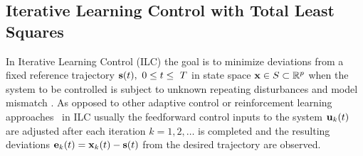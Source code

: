 \subsection{Iterative Learning Control with Total Least Squares}\label{ilcTLS}
%
In Iterative Learning Control (ILC) the goal is to minimize deviations from a fixed reference trajectory $\boldsymbol{\mathrm{s}}(t), \ 0 \leq t \leq~T$ in state space $\boldsymbol{\mathrm{x}} \in S \subset \mathbb{R}^{p}$ when the system to be controlled is subject to unknown repeating disturbances and model mismatch \cite{Bristow06}. As opposed to other adaptive control or reinforcement learning approaches~\cite{NguyenTuong11} in ILC usually the feedforward control inputs to the system $\boldsymbol{\mathrm{u}}_k(t)$ are adjusted after each iteration $k = 1, 2, \ldots$ is completed and the resulting deviations $\boldsymbol{\mathrm{e}}_k(t) = \boldsymbol{\mathrm{x}}_k(t) - \boldsymbol{\mathrm{s}}(t)$ from the desired trajectory are observed. %

